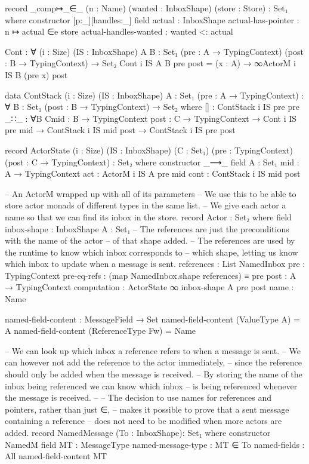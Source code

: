 \begin{code}
record _comp↦_∈_ (n : Name) (wanted : InboxShape) (store : Store) : Set₁ where
  constructor [p:_][handles:_]
  field
    {actual} : InboxShape
    actual-has-pointer : n ↦ actual ∈e store
    actual-handles-wanted : wanted <: actual

Cont : ∀ (i : Size) (IS : InboxShape) {A B : Set₁}
            (pre : A → TypingContext)
            (post : B → TypingContext) →
            Set₂
Cont i IS {A} {B} pre post = (x : A) → ∞ActorM i IS B (pre x) post

data ContStack (i : Size) (IS : InboxShape) {A : Set₁} (pre : A → TypingContext) :
     ∀ {B : Set₁} (post : B → TypingContext) → Set₂ where
  []    : ContStack i IS pre pre
  _∷_   : ∀{B C}{mid : B → TypingContext} {post : C → TypingContext}
        → Cont i IS pre mid → ContStack i IS mid post → ContStack i IS pre post

record ActorState (i : Size) (IS : InboxShape) (C : Set₁) (pre : TypingContext) (post : C → TypingContext) : Set₂ where
  constructor _⟶_
  field
    {A}   : Set₁
    {mid} : A → TypingContext
    act   : ActorM i IS A pre mid
    cont  : ContStack i IS mid post

-- An ActorM wrapped up with all of its parameters
-- We use this to be able to store actor monads of different types in the same list.
-- We give each actor a name so that we can find its inbox in the store.
record Actor : Set₂ where
  field
    inbox-shape : InboxShape
    A           : Set₁
    -- The references are just the preconditions with the name of the actor
    -- of that shape added.
    -- The references are used by the runtime to know which inbox corresponds to
    -- which shape, letting us know which inbox to update when a message is sent.
    references  : List NamedInbox
    pre         : TypingContext
    pre-eq-refs : (map NamedInbox.shape references) ≡ pre
    post        : A → TypingContext
    computation : ActorState ∞ inbox-shape A pre post
    name        : Name

named-field-content : MessageField → Set
named-field-content (ValueType A) = A
named-field-content (ReferenceType Fw) = Name

-- We can look up which inbox a reference refers to when a message is sent.
-- We can however not add the reference to the actor immediately,
-- since the reference should only be added when the message is received.
-- By storing the name of the inbox being referenced we can know which inbox
-- is being referenced whenever the message is received.
--
-- The decision to use names for references and pointers, rather than just ∈,
-- makes it possible to prove that a sent message containing a reference
-- does not need to be modified when more actors are added.
record NamedMessage (To : InboxShape): Set₁ where
  constructor NamedM
  field
    {MT} : MessageType
    named-message-type : MT ∈ To
    named-fields : All named-field-content MT


\end{code}
